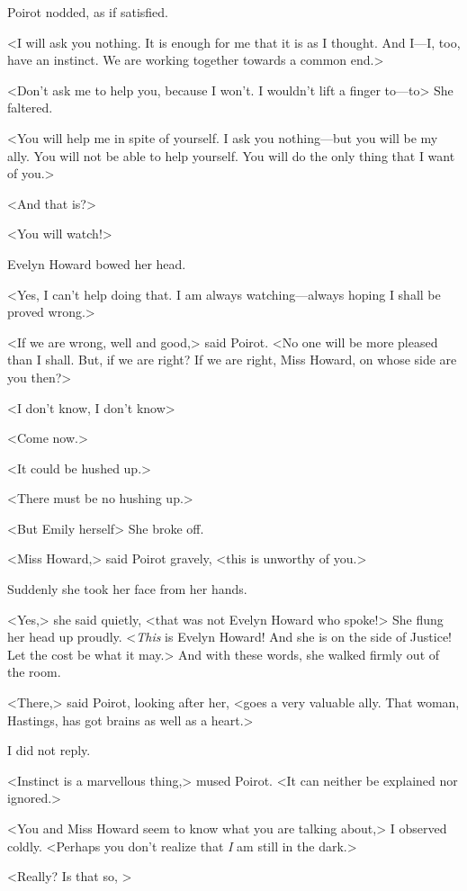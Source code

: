  Poirot nodded, as if satisfied. 

 <I will ask you nothing. It is enough for me that it is as I thought. And I—I, too, have an instinct. We are working together towards a common end.> 

 <Don't ask me to help you, because I won't. I wouldn't lift a finger to—to\longdash> She faltered. 

 <You will help me in spite of yourself. I ask you nothing—but you will be my ally. You will not be able to help yourself. You will do the only thing that I want of you.> 

 <And that is?> 

 <You will watch!> 

 Evelyn Howard bowed her head. 

 <Yes, I can't help doing that. I am always watching—always hoping I shall be proved wrong.> 

 <If we are wrong, well and good,> said Poirot. <No one will be more pleased than I shall. But, if we are right? If we are right, Miss Howard, on whose side are you then?> 

 <I don't know, I don't know\longdash> 

 <Come now.> 

 <It could be hushed up.> 

 <There must be no hushing up.> 

 <But Emily herself\longdash> She broke off. 

 <Miss Howard,> said Poirot gravely, <this is unworthy of you.> 

 Suddenly she took her face from her hands. 

 <Yes,> she said quietly, <that was not Evelyn Howard who spoke!> She flung her head up proudly. <\emph{This} is Evelyn Howard! And she is on the side of Justice! Let the cost be what it may.> And with these words, she walked firmly out of the room. 

 <There,> said Poirot, looking after her, <goes a very valuable ally. That woman, Hastings, has got brains as well as a heart.> 

 I did not reply. 

 <Instinct is a marvellous thing,> mused Poirot. <It can neither be explained nor ignored.> 

 <You and Miss Howard seem to know what you are talking about,> I observed coldly. <Perhaps you don't realize that \emph{I} am still in the dark.> 

 <Really? Is that so, > 


